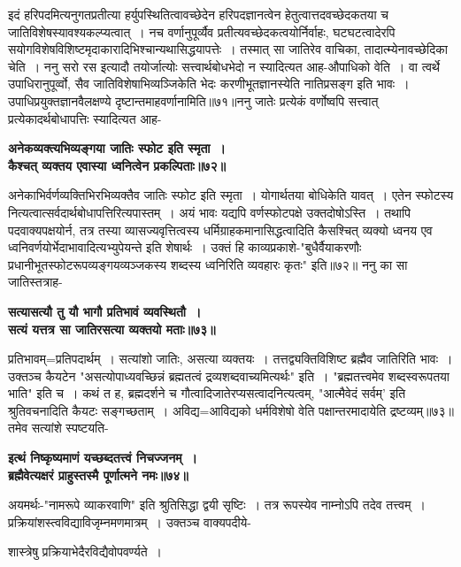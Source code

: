 {{{{ इदं हरिपदमित्यनुगतप्रतीत्या हर्युपस्थितित्वावच्छेदेन हरिपदज्ञानत्वेन हेतुत्वात्तदवच्छेदकतया च जातिविशेषस्यावश्यकल्प्यत्वात्~।
नच वर्णानुपूर्व्यैव प्रतीत्यवच्छेदकत्वयोर्निर्वाहः, घटघटत्वादेरपि सयोगविशेषविशिष्टमृदाकारादिभिश्चान्यथासिद्धयापत्तेः~।
 तस्मात् सा जातिरेव वाचिका, तादात्म्येनावच्छेदिका चेति~।
ननु सरो रस इत्यादौ तयोर्जात्योः सत्त्वार्थबोधभेदो न स्यादित्यत आह-औपाधिको वेति~।
वा त्वर्थे उपाधिरानुपूर्व्वो, सैव जातिविशेषाभिव्यञ्जिकेति भेदः करणीभूतज्ञानस्येति नातिप्रसङ्ग इति भावः~।
उपाधिप्रयुक्तज्ञानवैलक्षण्ये दृष्टान्तमाहवर्णानामिति॥७१॥ननु जातेः प्रत्येकं वर्णोष्वपि सत्त्वात् प्रत्येकादर्थबोधापत्तिः स्यादित्यत आह-
\begin{center}{\bfseries अनेकव्यक्त्यभिव्यङ्गया जातिः स्फोट इति स्मृता~।\\
कैश्चत् व्यक्तय एवास्या ध्वनित्वेन प्रकल्पिताः॥७२॥}\end{center}
 अनेकाभिर्वर्णव्यक्तिभिरभिव्यक्तैव जातिः स्फोट इति स्मृता~।
योगार्थतया बोधिकेति यावत्~।
एतेन स्फोटस्य नित्यत्वात्सर्वदार्थबोधापत्तिरित्यपास्तम्~।
अयं भावः यद्यपि वर्णस्फोटपक्षे उक्तदोषोऽस्ति~।
तथापि पदवाक्यपक्षयोर्न, तत्र तस्या व्यासज्यवृत्तित्वस्य धर्मिग्राहकमानासिद्धत्वादिति कैसश्चित् व्यक्यो ध्वनय एव ध्वनिवर्णयोर्भेदाभावादित्यभ्युपेयन्ते इति शेषार्थः~।
उक्तं हि काव्यप्रकाशे-"बुधैर्वैयाकरणौः प्रधानीभूतस्फोटरूपव्यङ्गयव्यञ्जकस्य शब्दस्य ध्वनिरिति व्यवहारः कृतः" इति॥७२॥
 ननु का सा जातिस्तत्राह-
 \begin{center}{\bfseries सत्यासत्यौ तु यौ भागौ प्रतिभावं व्यवस्थितौ~।\\
सत्यं यत्तत्र सा जातिरसत्या व्यक्तयो मताः॥७३॥}\end{center}
प्रतिभावम्=प्रतिपदार्थम्~।
सत्यांशो जातिः, असत्या व्यक्तयः~।
तत्तद्व्यक्तिविशिष्ट ब्रह्मैव जातिरिति भावः~।
उक्तञ्च कैयटेन "असत्योपाध्यवच्छिन्नं ब्रह्मतत्वं द्रव्यशब्दवाच्यमित्यर्थः" इति~।
"ब्रह्मतत्त्वमेव शब्दस्वरूपतया भाति" इति च~।
कथं त ह, ब्रह्मदर्शने च गौत्वादिजातेरप्यसत्वादनित्यत्वम्, "आत्मैवेदं सर्वम्' इति श्रुतिवचनादिति कैयटः सङ्गच्छताम्~।
अविद्य=आविद्यको धर्मविशेषो वेति पक्षान्तरमादायेति द्रष्टव्यम्॥७३॥
तमेव सत्यांशे स्पष्टयति-
\begin{center}{\bfseries इत्थं निष्कृष्यमाणं यच्छब्दतत्त्वं निचज्जनम्~।\\
ब्रह्मैवेत्यक्षरं प्राहुस्तस्मै पूर्णात्मने नमः॥७४॥}\end{center}
 अयमर्थः-"नामरूपे व्याकरवाणि" इति श्रुतिसिद्धा द्वयी सृष्टिः~।
तत्र रूपस्येव नाम्नोऽपि तदेव तत्त्वम्~।
प्रक्रियांशस्त्वविद्याविजृम्नमणमात्रम्~।
उक्तञ्च वाक्यपदीये-
\begin{center}
शास्त्रेषु प्रक्रियाभेदैरविद्यैवोपवर्ण्यते~।\\

\end{center}}}}}
